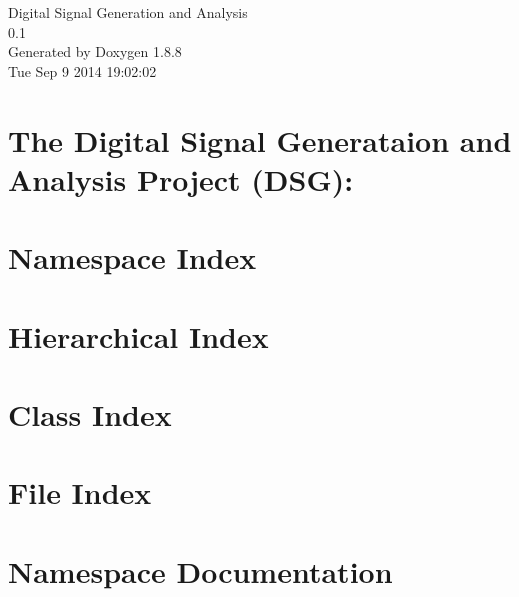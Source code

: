 \documentclass[twoside]{book}
\newcommand{\+}{\discretionary{\mbox{\scriptsize$\hookleftarrow$}}{}{}}
\newcommand{\clearemptydoublepage}{%
  \newpage{\pagestyle{empty}\cleardoublepage}%
}
\begin{document}
\hypersetup{pageanchor=false,
             bookmarks=true,
             bookmarksnumbered=true,
             pdfencoding=unicode
            }
\begin{titlepage}
\vspace*{7cm}
\begin{center}%
{\Large Digital Signal Generation and Analysis \\[1ex]\large 0.\+1 }\\
\vspace*{1cm}
{\large Generated by Doxygen 1.8.8}\\
\vspace*{0.5cm}
{\small Tue Sep 9 2014 19:02:02}\\
\end{center}
\end{titlepage}
\clearemptydoublepage
\tableofcontents
\clearemptydoublepage
{}
\hypersetup{pageanchor=true}

\chapter{The Digital Signal Generataion and Analysis Project (D\+S\+G)\+:}
\label{index}\hypertarget{index}{}
\chapter{Namespace Index}

\chapter{Hierarchical Index}

\chapter{Class Index}

\chapter{File Index}

\chapter{Namespace Documentation}





\end{document}
